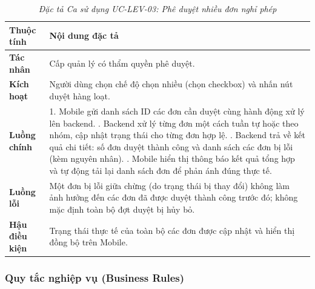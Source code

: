 \begin{table}[H]
\centering
\renewcommand{\arraystretch}{1.25}
\begin{tabularx}{\textwidth}{|p{3.2cm}|X|}
\hline
\textbf{Thuộc tính} & \textbf{Nội dung đặc tả} \\
\hline
\textbf{Tác nhân} & Cấp quản lý có thẩm quyền phê duyệt. \\
\hline
\textbf{Kích hoạt} & Người dùng chọn chế độ chọn nhiều (chọn checkbox) và nhấn nút duyệt hàng loạt. \\
\hline
\textbf{Luồng chính} & 
1. Mobile gửi danh sách ID các đơn cần duyệt cùng hành động xử lý lên backend. \newline
2. Backend xử lý từng đơn một cách tuần tự hoặc theo nhóm, cập nhật trạng thái cho từng đơn hợp lệ. \newline
3. Backend trả về kết quả chi tiết: số đơn duyệt thành công và danh sách các đơn bị lỗi (kèm nguyên nhân). \newline
4. Mobile hiển thị thông báo kết quả tổng hợp và tự động tải lại danh sách đơn để phản ánh đúng thực tế. \\
\hline
\textbf{Luồng lỗi} & Một đơn bị lỗi giữa chừng (do trạng thái bị thay đổi) không làm ảnh hưởng đến các đơn đã được duyệt thành công trước đó; không mặc định toàn bộ đợt duyệt bị hủy bỏ. \\
\hline
\textbf{Hậu điều kiện} & Trạng thái thực tế của toàn bộ các đơn được cập nhật và hiển thị đồng bộ trên Mobile. \\
\hline
\end{tabularx}
\caption{\textit{Đặc tả Ca sử dụng UC-LEV-03: Phê duyệt nhiều đơn nghỉ phép}}
\label{tab:uc_lev_03}
\end{table}

\subsubsection{Quy tắc nghiệp vụ (Business Rules)}

